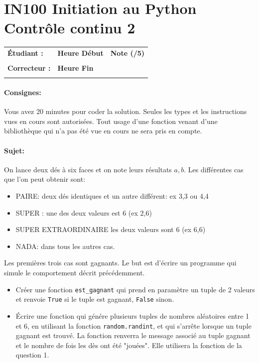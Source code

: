 \documentclass[a4paper,11pt]{article}
\begin{document}
\newpage


\section*{\center IN100 Initiation au Python\\
Contrôle continu 2}


\begin{table}[h!]
\centering
\renewcommand{\arraystretch}{1.4} %
\begin{tabular}{|p{10cm}|p{3cm}|p{2cm}|}
\hline
\textbf{Étudiant :} & \textbf{Heure Début }  & \textbf{Note (/5) }  \\
& & \\
\hline
\textbf{Correcteur :} & \textbf{Heure Fin } & \\
& & \\
\hline

\hline
\end{tabular}
\end{table}

\vspace{-0.4cm}
\paragraph*{Consignes:} Vous avez 20 minutes pour coder la solution. Seules les types et les instructions vues en cours sont autorisées. Tout usage d'une fonction 
venant d'une bibliothèque qui n'a pas été vue en cours ne sera pris en compte. 

\vspace{-0.2cm}
\paragraph*{Sujet:} On lance deux dés à six faces et on note leurs résultats $a,b$.  Les différentes cas que l'on peut obtenir sont:
\begin{itemize}
\item  PAIRE: deux dés identiques et un autre différent: ex 3,3 ou 4,4
\item  SUPER : une des deux valeurs est 6 (ex 2,6)
\item SUPER EXTRAORDINAIRE les deux valeurs sont 6 (ex 6,6) 
\item NADA: dans tous les autres cas. 
\end{itemize}

Les premières trois cas sont gagnants. Le but est d'écrire un programme qui simule le comportement décrit précédemment.
\begin{itemize}
\item[1.] Créer une fonction \texttt{est\_gagnant} qui prend en paramètre un tuple de 2 valeurs et renvoie \texttt{True} si le tuple est gagnant, \texttt{False} sinon. 
\item[2.]  \'Ecrire une fonction qui génére plusieurs tuples de nombres aléatoires entre 1 et 6, en utilisant la fonction \texttt{random.randint}, et qui s'arrête lorsque un tuple gagnant est trouvé. 
La fonction renverra le message associé au tuple gagnant et le nombre de fois les dès ont été "jouées". Elle utilisera la fonction de la question 1. 
\end{itemize}
\end{document}
